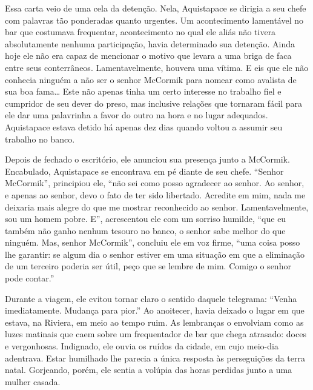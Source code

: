 Essa carta veio de uma cela da detenção. Nela, Aquistapace se dirigia a
seu chefe com palavras tão ponderadas quanto urgentes. Um acontecimento
lamentável no bar que costumava frequentar, acontecimento no qual ele
aliás não tivera absolutamente nenhuma participação, havia determinado
sua detenção. Ainda hoje ele não era capaz de mencionar o motivo que
levara a uma briga de faca entre seus conterrâneos. Lamentavelmente,
houvera uma vítima. E eis que ele não conhecia ninguém a não ser o
senhor McCormik para nomear como avalista de sua boa fama\ldots{} Este não
apenas tinha um certo interesse no trabalho fiel e cumpridor de seu
dever do preso, mas inclusive relações que tornaram fácil para ele dar
uma palavrinha a favor do outro na hora e no lugar adequados.
Aquistapace estava detido há apenas dez dias quando voltou a assumir seu
trabalho no banco.

Depois de fechado o escritório, ele anunciou sua presença junto a
McCormik. Encabulado, Aquistapace se encontrava em pé diante de seu
chefe. ``Senhor McCormik'', principiou ele, ``não sei como posso
agradecer ao senhor. Ao senhor, e apenas ao senhor, devo o fato de ter
sido libertado. Acredite em mim, nada me deixaria mais alegre do que me
mostrar reconhecido ao senhor. Lamentavelmente, sou um homem pobre. E'',
acrescentou ele com um sorriso humilde, ``que eu também não ganho nenhum
tesouro no banco, o senhor sabe melhor do que ninguém. Mas, senhor
McCormik'', concluiu ele em voz firme, ``uma coisa posso lhe garantir:
se algum dia o senhor estiver em uma situação em que a eliminação de um
terceiro poderia ser útil, peço que se lembre de mim. Comigo o senhor
pode contar.''




Durante a viagem, ele evitou tornar claro o sentido daquele telegrama:
``Venha imediatamente. Mudança para pior.'' Ao anoitecer, havia deixado
o lugar em que estava, na Riviera, em meio ao tempo ruim. As lembranças
o envolviam como as luzes matinais que caem sobre um frequentador de bar
que chega atrasado: doces e vergonhosas. Indignado, ele ouvia os ruídos
da cidade, em cujo meio-dia adentrava. Estar humilhado lhe parecia a
única resposta às perseguições da terra natal. Gorjeando, porém, ele
sentia a volúpia das horas perdidas junto a uma mulher casada.

